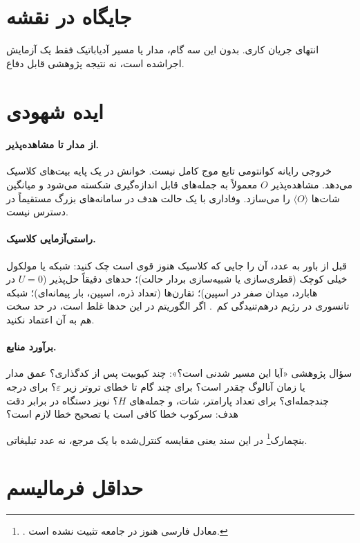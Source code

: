\section{جایگاه در نقشه}

انتهای جریان کاری. بدون این سه گام، مدار یا مسیر آدیاباتیک فقط یک آزمایش اجراشده است، نه نتیجه پژوهشی قابل دفاع.

\section{ایده شهودی}

\paragraph{از مدار تا مشاهده‌پذیر.}
خروجی رایانه کوانتومی تابع موج کامل نیست. خوانش در یک پایه بیت‌های کلاسیک می‌دهد. مشاهده‌پذیر $O$ معمولاً به جمله‌های قابل اندازه‌گیری شکسته می‌شود و میانگین شات‌ها $\langle O\rangle$ را می‌سازد. وفاداری
 با یک حالت هدف در سامانه‌های بزرگ مستقیماً در دسترس نیست.

\paragraph{راستی‌آزمایی کلاسیک.}
قبل از باور به عدد، آن را جایی که کلاسیک هنوز قوی است چک کنید: شبکه یا مولکول خیلی کوچک (قطری‌سازی یا شبیه‌سازی بردار حالت)؛ حدهای دقیقاً حل‌پذیر ($U=0$ در هابارد، میدان صفر در اسپین)؛ تقارن‌ها (تعداد ذره، اسپین، بار پیمانه‌ای)؛ شبکه تانسوری در رژیم درهم‌تنیدگی کم~\cite{Daley2022,Cirac2021}. اگر الگوریتم در این حدها غلط است، در حد سخت هم به آن اعتماد نکنید.

\paragraph{برآورد منابع.}
سؤال پژوهشی «آیا این مسیر شدنی است؟»: چند کیوبیت پس از کدگذاری؟ عمق مدار یا زمان آنالوگ چقدر است؟ برای  چند گام تا خطای تروتر زیر $\varepsilon$؟ برای  درجه چندجمله‌ای؟ برای  تعداد پارامتر، شات، و جمله‌های $H$؟ نویز دستگاه در برابر دقت هدف: سرکوب خطا کافی است یا تصحیح خطا لازم است؟

بنچمارک\footnote{. معادل فارسی هنوز در جامعه تثبیت نشده است.} در این سند یعنی مقایسه کنترل‌شده با یک مرجع، نه عدد تبلیغاتی.

\section{حداقل فرمالیسم}

